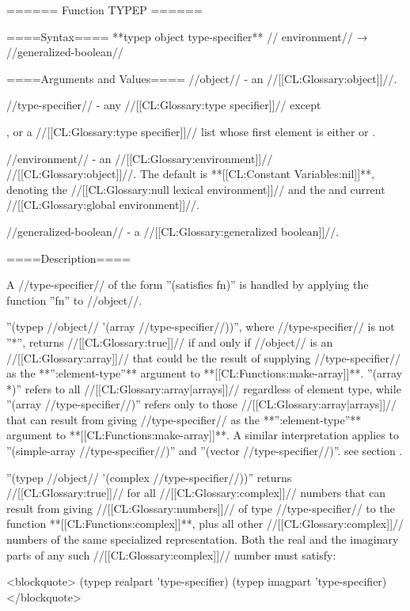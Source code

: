 ====== Function TYPEP ======

====Syntax====
**typep {object type-specifier** //\opt} environment// → //generalized-boolean//

====Arguments and Values====
//object// - an //[[CL:Glossary:object]]//.

//type-specifier// - any //[[CL:Glossary:type specifier]]// except

, or a //[[CL:Glossary:type specifier]]// list whose first element is either  or .

//environment// - an //[[CL:Glossary:environment]]// //[[CL:Glossary:object]]//. The default is **[[CL:Constant Variables:nil]]**, denoting the //[[CL:Glossary:null lexical environment]]// and the and current //[[CL:Glossary:global environment]]//.

//generalized-boolean// - a //[[CL:Glossary:generalized boolean]]//.

====Description====

A //type-specifier// of the form ''(satisfies fn)'' is handled by applying the function ''fn'' to //object//.

''(typep //object// '(array //type-specifier//))'', where //type-specifier// is not ''*'', returns //[[CL:Glossary:true]]// if and only if //object// is an //[[CL:Glossary:array]]// that could be the result of supplying //type-specifier// as the **'':element-type''** argument to **[[CL:Functions:make-array]]**. ''(array *)'' refers to all //[[CL:Glossary:array|arrays]]// regardless of element type, while ''(array //type-specifier//)'' refers only to those //[[CL:Glossary:array|arrays]]// that can result from giving //type-specifier// as the **'':element-type''** argument to **[[CL:Functions:make-array]]**. A similar interpretation applies to ''(simple-array //type-specifier//)'' and ''(vector //type-specifier//)''. see section {\secref\ArrayUpgrading}.

''(typep //object// '(complex //type-specifier//))'' returns //[[CL:Glossary:true]]// for all //[[CL:Glossary:complex]]// numbers that can result from giving //[[CL:Glossary:numbers]]// of type //type-specifier// to the function **[[CL:Functions:complex]]**, plus all other //[[CL:Glossary:complex]]// numbers of the same specialized representation. Both the real and the imaginary parts of any such //[[CL:Glossary:complex]]// number must satisfy:

<blockquote> (typep realpart 'type-specifier) (typep imagpart 'type-specifier) </blockquote>

